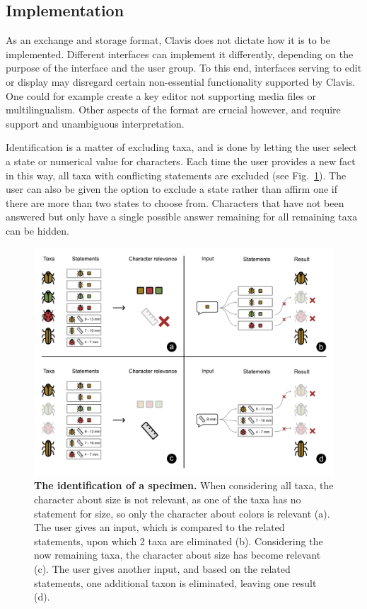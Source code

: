 \documentclass[10pt,letterpaper]{article}
\begin{document}
\subsection*{
Implementation
}
As an exchange and storage format, Clavis does not dictate how it is to be implemented. Different interfaces can implement it differently, depending on the purpose of the interface and the user group. To this end, interfaces serving to edit or display may disregard certain non-essential functionality supported by Clavis. One could for example create a key editor not supporting media files or multilingualism. Other aspects of the format are crucial however, and require support and unambiguous interpretation.

Identification is a matter of excluding taxa, and is done by letting the user select a state or numerical value for characters. Each time the user provides a new fact in this way, all taxa with conflicting statements are excluded (see Fig.~\ref{fig2}). The user can also be given the option to exclude a state rather than affirm one if there are more than two states to choose from. Characters that have not been answered but only have a single possible answer remaining for all remaining taxa can be hidden.


\begin{figure}[!h]
  \includegraphics[width=\textwidth]{Images/Fig2}
  \caption{{\bf The identification of a specimen.}
  When considering all taxa, the character about size is not relevant, as one of the taxa has no statement for size, so only the character about colors is relevant (a). The user gives an input, which is compared to the related statements, upon which 2 taxa are eliminated (b). Considering the now remaining taxa, the character about size has become relevant (c). The user gives another input, and based on the related statements, one additional taxon is eliminated, leaving one result (d).
  }
  \label{fig2}
 \end{figure}
\end{document}

